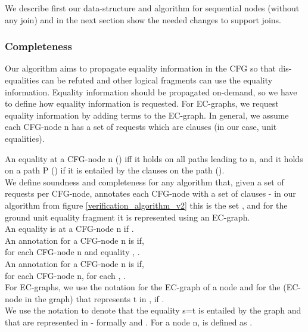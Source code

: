We describe first our data-structure and algorithm for sequential nodes (without any join) and in the next section show the needed changes to support joins.

\subsubsection*{Completeness}
Our algorithm aims to propagate equality information in the CFG so that dis-equalities can be refuted and other logical fragments can use the equality information. Equality information should be propagated on-demand, so we have to define how equality information is requested. For EC-graphs, we request equality information by adding terms to the EC-graph. 
In general, we assume each CFG-node n has a set of requests  which are clauses (in our case, unit equalities).

An equality   at a CFG-node n () iff it holds on all paths leading to n, and it holds on a path P () if it is entailed by the clauses on the path ().\\
We define soundness and completeness for any algorithm that, given a set of requests  per CFG-node, annotates each CFG-node with a set of clauses   - in our algorithm from figure \ref{verification_algorithm_v2} this is the set , and for the ground unit equality fragment it is represented using an EC-graph.\\
An equality  is  at a CFG-node n if .\\
An annotation for a CFG-node n is  if,\\ for each CFG-node n and equality , .\\
An annotation for a CFG-node n is  if, \\ for each CFG-node n, for each , .\\
For EC-graphs, we use the notation  for the EC-graph of a node  and  for the \GT{} (EC-node in the graph) that represents t in , if .\\
We use the notation  to denote that the equality s=t is entailed by the graph  and that  are represented in  - formally  and . For a node n,  is defined as . 


